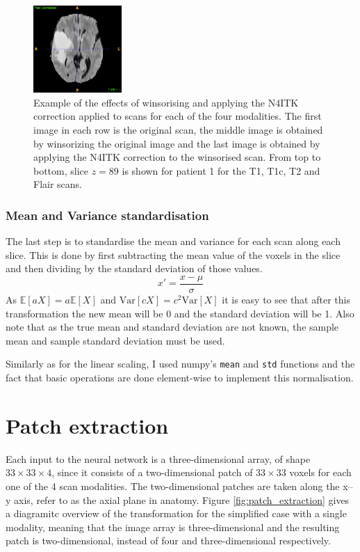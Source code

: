 \documentclass[12pt,a4paper,twoside,openright]{report}
\begin{document}
\begin{figure}
	\includegraphics[width=0.3\textwidth]{flair_n4itk_example}
	\caption{Example of the effects of winsorising and applying the N4ITK correction applied to scans for each of the four modalities. The first image in each row is the original scan, the middle image is obtained by winsorizing the original image and the last image is obtained by applying the N4ITK correction to the winsorised scan. From top to bottom, slice $z=89$ is shown for patient 1 for the T1, T1c, T2 and Flair scans.}
\end{figure}

\subsubsection{Mean and Variance standardisation}
The last step is to standardise the mean and variance for each scan along each slice. This is done by first subtracting the mean value of the voxels in the slice and then dividing by the standard deviation of those values. 
\begin{equation}
	x' = \frac{x - \mu}{\sigma}
\end{equation}
As $\mathbb{E}[aX] = a \mathbb{E}[X]$ and $\textrm{Var} [cX] = c^2 \textrm{Var} [X]$ it is easy to see that after this transformation the new mean will be 0 and the standard deviation will be 1. Also note that as the true mean and standard deviation are not known, the sample mean and sample standard deviation must be used. 

Similarly as for the linear scaling, I used numpy's \texttt{mean} and \texttt{std} functions and the fact that basic operations are done element-wise to implement this normalisation.

\section{Patch extraction}
\label{section:patch_extraction}
Each input to the neural network is a three-dimensional array, of shape $33 \times 33 \times 4$, since it consists of a two-dimensional patch of $33 \times 33$ voxels for each one of the 4 scan modalities. The two-dimensional patches are taken along the x--y axis, refer to as the axial plane in anatomy. Figure \ref{fig:patch_extraction} gives a diagramitc overview of the transformation for the simplified case with a single modality, meaning that the image array is three-dimensional and the resulting patch is two-dimensional, instead of four and three-dimensional respectively.
\end{document}
